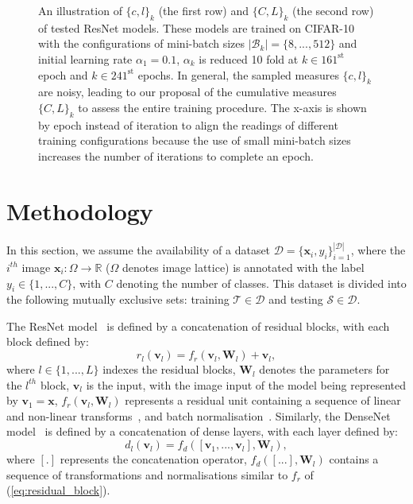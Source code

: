 \documentclass[10pt,journal,compsoc]{IEEEtran}
\begin{document}
\begin{figure*}
\caption{An illustration of $\{c, l\}_k$ (the first row) and $\{C, L\}_k$ (the second row) of tested ResNet models.  These models are trained on CIFAR-10 with the configurations of mini-batch sizes $ {|\mathcal{B}_k|} = \{8, ..., 512\}$ and initial learning rate $\alpha_1 = 0.1$, $\alpha_k$ is reduced 10 fold at $k \in 161^{\text{st}}$ epoch and $k \in 241^{\text{st}}$ epochs. In general, the sampled measures $\{c,l\}_k$ are noisy, leading to our proposal of the cumulative measures $\{C,L\}_k$ to assess the entire training procedure. The x-axis is shown by epoch instead of iteration to align the readings of different training configurations because the use of small mini-batch sizes increases the number of iterations to complete an epoch.}
\label{fig:cond_eig}
\end{figure*}


\section{Methodology}



In this section, we assume the availability of a dataset $\mathcal{D} = \{ \mathbf{x}_i, y_i \}_{i=1}^{|\mathcal{D}|}$, where the $i^{th}$ image $\mathbf{x}_i:\Omega \rightarrow \mathbb R$ ($\Omega$ denotes image lattice) is annotated with the label $y_i \in \{1,...,C\}$, with $C$ denoting the number of classes.  This dataset is divided into  the following mutually exclusive sets: training $\mathcal{T} \in \mathcal{D}$ and testing $\mathcal{S} \in \mathcal{D}$.



The ResNet model~\cite{he2016deep} is defined by a concatenation of residual blocks, with each block defined by:
\begin{equation}
r_l(\mathbf{v}_l) = f_r(\mathbf{v}_l,\mathbf{W}_l) + \mathbf{v}_l,
\label{eq:residual_block}
\end{equation}
where $l \in \{1,...,L\}$ indexes the residual blocks, $\mathbf{W}_l$ denotes the parameters for the $l^{th}$ block, $\mathbf{v}_l$ is the input, with the image input of the model being represented by $\mathbf{v}_1 = \mathbf{x}$, $f_r(\mathbf{v}_l,\mathbf{W}_l)$ represents a residual unit containing a sequence of linear and non-linear transforms~\cite{nair2010rectified}, and batch normalisation~\cite{ioffe2015batch}.  Similarly, the DenseNet model~\cite{huang2016densely} is defined by a concatenation of dense layers, with each layer defined by:
\begin{equation}
d_l(\mathbf{v}_l) = f_d([\mathbf{v}_1, ..., \mathbf{v}_l],\mathbf{W}_l),
\end{equation}
where $[.]$ represents the concatenation operator, $f_d([...],\mathbf{W}_l)$ contains a sequence of transformations and normalisations similar to $f_r$ of (\ref{eq:residual_block}).
\end{document}
